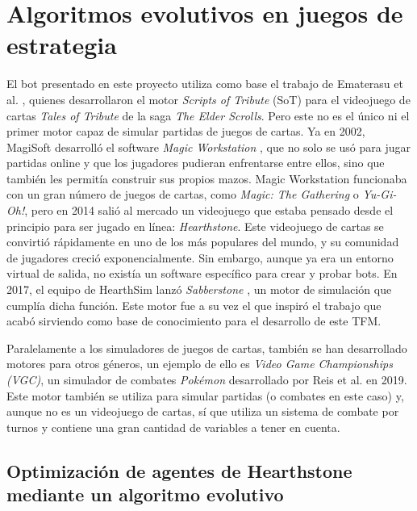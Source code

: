 \section{Algoritmos evolutivos en juegos de estrategia} \label{sec:trabajos_relacionados}

El bot presentado en este proyecto utiliza como base el trabajo de Ematerasu et al. \cite{ematerasu_scriptsoftribute_2022}, quienes desarrollaron el motor \textit{Scripts of Tribute} (SoT) para el videojuego de cartas \textit{Tales of Tribute} de la saga \textit{The Elder Scrolls}. Pero este no es el único ni el primer motor capaz de simular partidas de juegos de cartas. Ya en 2002, MagiSoft desarrolló el software \textit{Magic Workstation} \cite{magi-soft_development_magic_2002}, que no solo se usó para jugar partidas online y que los jugadores pudieran enfrentarse entre ellos, sino que también les permitía construir sus propios mazos. Magic Workstation funcionaba con un gran número de juegos de cartas, como \textit{Magic: The Gathering} o \textit{Yu-Gi-Oh!}, pero en 2014 salió al mercado un videojuego que estaba pensado desde el principio para ser jugado en línea: \textit{Hearthstone}. Este videojuego de cartas se convirtió rápidamente en uno de los más populares del mundo, y su comunidad de jugadores creció exponencialmente. Sin embargo, aunque ya era un entorno virtual de salida, no existía un software específico para crear y probar bots. En 2017, el equipo de HearthSim lanzó \textit{Sabberstone} \cite{hearthsim_hearthsimsabberstone_2017}, un motor de simulación que cumplía dicha función. Este motor fue a su vez el que inspiró el trabajo que acabó sirviendo como base de conocimiento para el desarrollo de este TFM.

Paralelamente a los simuladores de juegos de cartas, también se han desarrollado motores para otros géneros, un ejemplo de ello es \textit{Video Game Championships (VGC)}, un simulador de combates \textit{Pokémon} desarrollado por Reis et al. \cite{simao_reis_vgc_2019} en 2019. Este motor también se utiliza para simular partidas (o combates en este caso) y, aunque no es un videojuego de cartas, sí que utiliza un sistema de combate por turnos y contiene una gran cantidad de variables a tener en cuenta.

\subsection{Optimización de agentes de Hearthstone mediante un algoritmo evolutivo} \label{sec:algoritmo_evolutivo_sabberstone}

